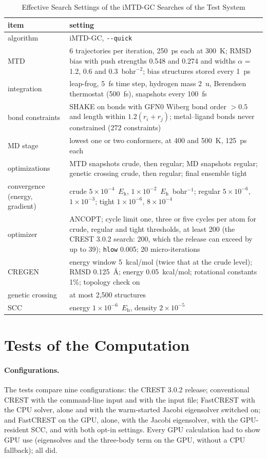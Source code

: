\documentclass[journal=jctcce,manuscript=suppinfo]{achemso}
\newcommand{\Eh}{\ensuremath{E_\mathrm{h}}}
\newcommand{\quickflag}{\texttt{-{}-quick}}
\begin{document}
\begin{table}[tbp]
\caption{Effective Search Settings of the iMTD-GC Searches of the Test System}
\label{tab:si-settings}
\small
\begin{tabular}{@{}L{0.27\textwidth}L{0.68\textwidth}@{}}
\toprule
item & setting \\
\midrule
algorithm & iMTD-GC, \quickflag \\
MTD & 6 trajectories per iteration, 250~ps each at 300~K; RMSD bias with push strengths 0.548 and 0.274 and widths $\alpha$ = 1.2, 0.6 and 0.3~bohr$^{-2}$; bias structures stored every 1~ps \\
integration & leap-frog, 5~fs time step, hydrogen mass 2~u, Berendsen thermostat (500~fs), snapshots every 100~fs \\
bond constraints & SHAKE on bonds with GFN0 Wiberg bond order $>0.5$ and length within $1.2(r_i+r_j)$; metal--ligand bonds never constrained (272 constraints) \\
MD stage & lowest one or two conformers, at 400 and 500~K, 125~ps each \\
optimizations & MTD snapshots crude, then regular; MD snapshots regular; genetic crossing crude, then regular; final ensemble tight \\
convergence (energy, gradient) & crude $5\times10^{-4}$~\Eh, $1\times10^{-2}$~\Eh~bohr$^{-1}$; regular $5\times10^{-6}$, $1\times10^{-3}$; tight $1\times10^{-6}$, $8\times10^{-4}$ \\
optimizer & ANCOPT; cycle limit one, three or five cycles per atom for crude, regular and tight thresholds, at least 200 (the CREST 3.0.2 search: 200, which the release can exceed by up to 39); \texttt{hlow} 0.005; 20 micro-iterations \\
CREGEN & energy window 5~kcal/mol (twice that at the crude level); RMSD 0.125~\AA; energy 0.05~kcal/mol; rotational constants 1\%; topology check on \\
genetic crossing & at most 2,500 structures \\
SCC & energy $1\times10^{-6}$~\Eh, density $2\times10^{-5}$ \\
\bottomrule
\end{tabular}
\end{table}

\section{Tests of the Computation}
\label{si:tests}

\paragraph{Configurations.} The tests compare nine configurations: the CREST 3.0.2 release; conventional CREST with the
command-line input and with the input file; FastCREST with the CPU solver, alone and with the warm-started Jacobi
eigensolver switched on; and FastCREST on the GPU, alone, with the Jacobi eigensolver, with the GPU-resident SCC, and
with both opt-in settings. Every GPU calculation had to show GPU use (eigensolves and the three-body term on the GPU, without a CPU fallback); all did.
\end{document}
